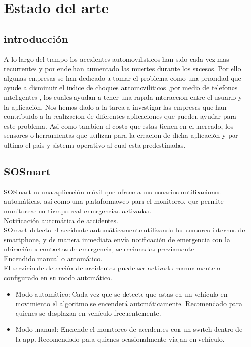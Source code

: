 \section{Estado del arte}

\subsection{introducción}

A lo largo del tiempo los  accidentes automovilisticos han sido cada vez mas recurrentes y por ende han aumentado las muertes durante los sucesos. Por ello algunas empresas se han dedicado a tomar el problema como una prioridad que ayude a disminuir el indice de choques automoviliticos ,por medio de telefonos inteligentes , los cuales ayudan a tener una rapida interaccion entre el usuario y la aplicación.
Nos hemos dado a la tarea a investigar las empresas que han contribuido a la realizacion de diferentes aplicaciones que pueden ayudar para este problema. Asi como tambien el costo que estas tienen en el mercado, los sensores o herramientas que utilizan para la creacion de dicha aplicación y por ultimo el pais y sistema operativo al cual esta predestinadas.

\subsection{SOSmart}
SOSmart es una aplicación móvil que ofrece a sus usuarios notificaciones automáticas, así como una plataformaweb para el monitoreo, que permite monitorear en tiempo real emergencias activadas.\\

Notificación automática de accidentes.\\
SOmart detecta el accidente automáticamente utilizando los sensores internos del smartphone, y de manera inmediata envía notificación de emergencia con la ubicación a contactos de emergencia, seleccionados previamente.\\

Encendido manual o automático.\\
El servicio de detección de accidentes puede ser activado manualmente o configurado en su modo automático.
\begin{itemize}
	\item Modo automático: Cada vez que se detecte que estas en un vehículo en movimiento el algoritmo se encenderá automáticamente. Recomendado para quienes se desplazan en vehículo frecuentemente.
	
	\item Modo manual: Enciende el monitoreo de accidentes con un switch dentro de la app. Recomendado para quienes ocasionalmente viajan en vehículo.\\
\end{itemize}


